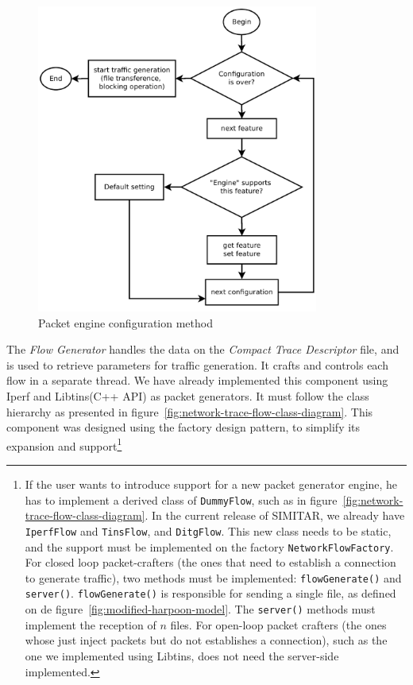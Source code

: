 \begin{figure}[pht!]
    \centering
    \includegraphics[height=4.0in]{figures/ch3/alg-traffic-engine-config}
    \caption{Packet engine configuration method}
    \label{fig:alg-traffic-engine-config}
\end{figure}



The \textit{Flow Generator} handles the data on the \textit{Compact Trace Descriptor} file, and is used to retrieve parameters for traffic generation. It crafts and controls each flow in a separate thread. We have already implemented this component using Iperf and Libtins(C++ API)\cite{web-libtins} as packet generators. It must follow the class hierarchy as presented in figure~\ref{fig:network-trace-flow-class-diagram}. This component was designed using the factory design pattern, to simplify its expansion and support\footnote{
If the user wants to introduce support for a new packet generator engine, he has to implement a derived class of \texttt{DummyFlow}, such as in figure~\ref{fig:network-trace-flow-class-diagram}. In the current release of SIMITAR, we already have \texttt{IperfFlow} and \texttt{TinsFlow}, and \texttt{DitgFlow}. This new class needs to be static, and the support must be implemented on the factory \texttt{NetworkFlowFactory}.
For closed loop packet-crafters (the ones that need to establish a connection to generate traffic), two methods must be implemented: \texttt{flowGenerate()} and \texttt{server()}. \texttt{flowGenerate()} is responsible for sending a single file, as defined on de figure~\ref{fig:modified-harpoon-model}. The \texttt{server()} methods must implement the reception of $n$ files. For open-loop packet crafters (the ones whose just inject packets but do not establishes a connection), such as the one we implemented using Libtins, does not need the server-side implemented. }


